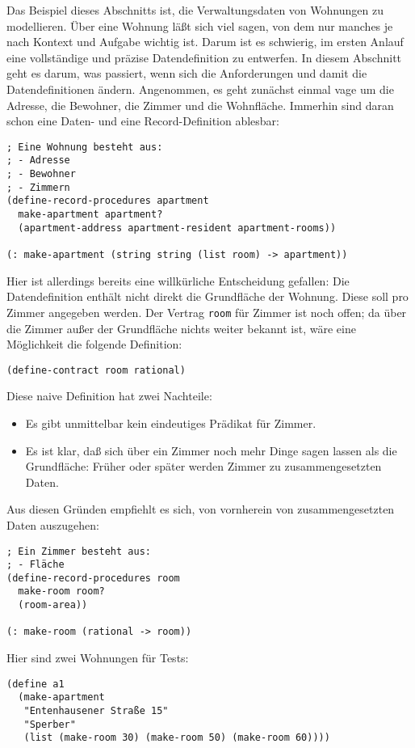 Das Beispiel dieses Abschnitts ist, die Verwaltungsdaten von Wohnungen
zu modellieren. Über eine Wohnung läßt sich viel sagen, von dem nur
manches je nach Kontext und Aufgabe wichtig ist.  Darum ist es
schwierig, im ersten Anlauf eine vollständige und präzise
Datendefinition zu entwerfen.  In diesem Abschnitt geht es darum, was
passiert, wenn sich die Anforderungen und damit die Datendefinitionen
ändern.  Angenommen, es geht zunächst einmal vage um die Adresse, die
Bewohner, die Zimmer und die Wohnfläche.  Immerhin sind daran schon
eine Daten- und eine Record-Definition ablesbar:
%
\begin{verbatim}
; Eine Wohnung besteht aus:
; - Adresse
; - Bewohner
; - Zimmern
(define-record-procedures apartment
  make-apartment apartment?
  (apartment-address apartment-resident apartment-rooms))

(: make-apartment (string string (list room) -> apartment))
\end{verbatim}
%
Hier ist allerdings bereits eine willkürliche Entscheidung gefallen:
Die Datendefinition enthält nicht direkt die Grundfläche der Wohnung.
Diese soll pro Zimmer angegeben werden.  Der Vertrag \texttt{room} für
Zimmer ist noch offen; da über die Zimmer außer der Grundfläche nichts
weiter bekannt ist, wäre eine Möglichkeit die folgende Definition:
%
\begin{verbatim}
(define-contract room rational)
\end{verbatim}
%
Diese naive Definition hat zwei Nachteile:
%
\begin{itemize}
\item Es gibt unmittelbar kein eindeutiges Prädikat für Zimmer.
\item Es ist klar, daß sich über ein Zimmer noch mehr Dinge sagen
  lassen als die Grundfläche: Früher oder später werden Zimmer zu
  zusammengesetzten Daten.
\end{itemize}
%
Aus diesen Gründen empfiehlt es sich, von vornherein von
zusammengesetzten Daten auszugehen:
%
\begin{verbatim}
; Ein Zimmer besteht aus:
; - Fläche
(define-record-procedures room
  make-room room?
  (room-area))

(: make-room (rational -> room))
\end{verbatim}
%
Hier sind zwei Wohnungen für Tests:
%
\begin{verbatim}
(define a1
  (make-apartment
   "Entenhausener Straße 15"
   "Sperber"
   (list (make-room 30) (make-room 50) (make-room 60))))
\end{verbatim}
